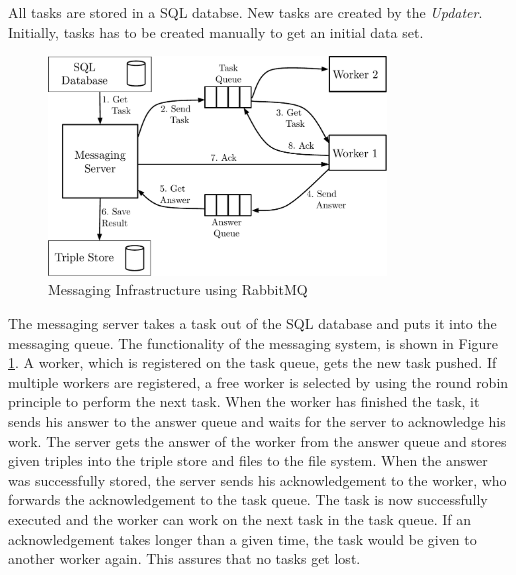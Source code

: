 All tasks are stored in a SQL databse.
New tasks are created by the \textit{Updater}.
Initially, tasks has to be created manually to get an initial data set.

\begin{figure}[ht]
  \begin{center}
  \includegraphics[width=0.8\textwidth]{images/rabbit_mq.pdf}
  \end{center}
  \caption{Messaging Infrastructure using RabbitMQ}
  \label{fig_messaging_infrastructure}
\end{figure}

The messaging server takes a task out of the SQL database and puts it into the messaging queue. 
The functionality of the messaging system, is shown in Figure \ref{fig_messaging_infrastructure}.
A worker, which is registered on the task queue, gets the new task pushed.
If multiple workers are registered, a free worker is selected by using the round robin principle to perform the next task.  
When the worker has finished the task, it sends his answer to the answer queue and waits for the server to acknowledge his work.
The server gets the answer of the worker from the answer queue and stores given triples into the triple store and files to the file system.
When the answer was successfully stored, the server sends his acknowledgement to the worker, who forwards the acknowledgement to the task queue.
The task is now successfully executed and the worker can work on the next task in the task queue.
If an acknowledgement takes longer than a given time, the task would be given to another worker again. This assures that no tasks get lost.